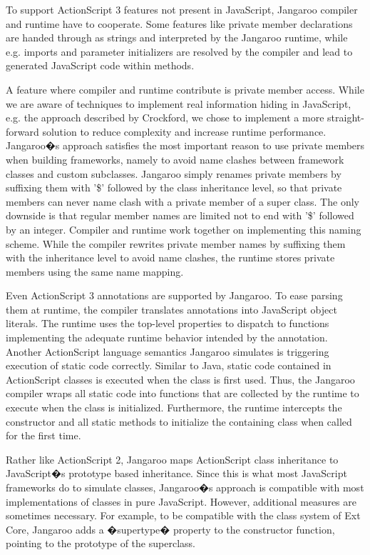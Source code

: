 \documentclass[11pt]{sigplanconf}
\begin{document}
To support ActionScript 3 features not present in Java\-Script, Jangaroo compiler and runtime have to co\-operate. Some features like private member declarations are handed through as strings and interpreted by the Jangaroo runtime, while e.g. imports and parameter initializers are resolved by the compiler and lead to generated JavaScript code within methods.

A feature where compiler and runtime contribute is private member access. While we are aware of techniques to implement real information hiding in JavaScript, e.g. the approach described by Crock\-ford\citep{Crockford2001-private.members}, we chose to implement a more straight-forward solution to reduce complexity and increase runtime performance. Jangaroo�s approach satisfies the most important reason to use private members when building frameworks, namely to avoid name clashes between framework classes and custom subclasses. Jangaroo simply renames private members by suffixing them with '\$' followed by the class inheritance level, so that private members can never name clash with a private member of a super class. The only downside is that regular member names are limited not to end with '\$' followed by an integer. Compiler and runtime work together on implementing this naming scheme. While the compiler rewrites private member names by suffixing them with the inheritance level to avoid name clashes, the runtime stores private members using the same name mapping.

Even ActionScript 3 annotations are supported by Jangaroo. To ease parsing them at runtime, the compiler translates annotations into JavaScript object literals. The runtime uses the top-level properties to dispatch to functions implementing the adequate runtime behavior intended by the annotation. Another ActionScript language semantics Jangaroo simulates is triggering execution of static code correctly. Similar to Java, static code contained in ActionScript classes is executed when the class is first used. Thus, the Jangaroo compiler wraps all static code into functions that are collected by the runtime to execute when the class is initialized. Furthermore, the runtime intercepts the constructor and all static methods to initialize the containing class when called for the first time.

Rather like ActionScript 2, Jangaroo maps ActionScript class inheritance to JavaScript�s prototype based inheritance. Since this is what most JavaScript frameworks do to simulate classes, Jangaroo�s approach is compatible with most implementations of classes in pure JavaScript. However, additional measures are sometimes necessary. For example, to be compatible with the class system of Ext Core\citep{ext-core}, Jangaroo adds a �supertype� property to the constructor function, pointing to the prototype of the superclass.
\end{document}
